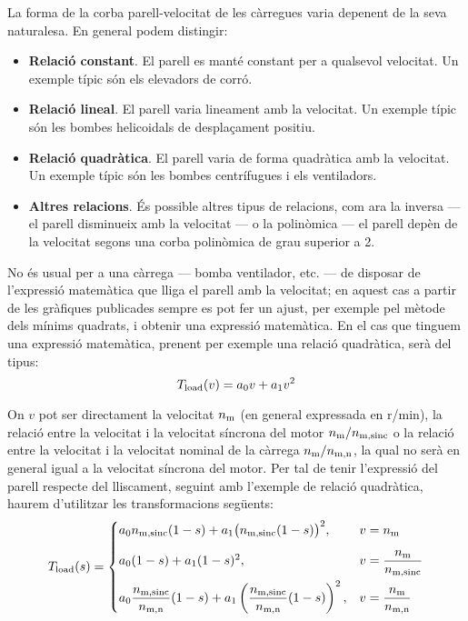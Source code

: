 La forma de la corba parell-velocitat de les càrregues varia depenent de la seva naturalesa. En general podem distingir:
\begin{itemize}
	\item  \textbf{Relació constant}. El parell es manté constant per a qualsevol velocitat. Un exemple típic són els elevadors de corró.
	
	\item  \textbf{Relació lineal}. El parell varia lineament amb la velocitat. Un exemple típic són les bombes helicoidals de desplaçament positiu.
	
	\item  \textbf{Relació quadràtica}. El parell varia de forma  quadràtica  amb la velocitat. Un exemple típic són les bombes centrífugues i els ventiladors.
	
	\item  \textbf{Altres relacions}. És possible altres tipus de relacions, com ara la inversa --- el parell disminueix amb la velocitat --- o la polinòmica --- el parell depèn de la velocitat segons una corba polinòmica de grau superior a 2.
\end{itemize}

No és  usual per a una càrrega --- bomba ventilador, etc. --- de disposar de l'expressió matemàtica que lliga el parell amb la velocitat; en aquest cas a partir de les gràfiques publicades sempre es pot fer un ajust, per exemple pel mètode dels mínims quadrats, i obtenir una expressió matemàtica. En el cas que tinguem una expressió matemàtica, prenent per exemple una relació quadràtica, serà del tipus:
\begin{equation}
	T_\mathrm{load}(v) = a_0 v + a_1 v^2
\end{equation}

On $v$ pot ser directament la velocitat $n_\mathrm{m}$ (en general expressada en r/min),  la relació entre la velocitat i la velocitat síncrona del motor $n_\mathrm{m}/n_\mathrm{m,sinc}$ o la relació entre la velocitat i la velocitat nominal de la càrrega $n_\mathrm{m}/n_\mathrm{m,n}$, la qual no serà en general igual a la velocitat síncrona del motor. Per tal de tenir l'expressió del parell respecte del lliscament,  seguint amb l'exemple de relació quadràtica, haurem d'utilitzar les transformacions següents:
\begin{equation}\label{eq:Tload-v-s}
	T_\mathrm{load}(s) = \begin{cases}
		 a_0 n_\mathrm{m,sinc}(1-s) + a_1 \big(n_\mathrm{m,sinc}(1-s)\big)^2,  & v=n_\mathrm{m}  \\[2ex]
		a_0 (1-s) + a_1 (1-s)^2, &   
		v =\dfrac{n_\mathrm{m}}{n_\mathrm{m,sinc}} \\[2ex]
		 a_0 \dfrac{n_\mathrm{m,sinc}}{n_\mathrm{m,n}}(1-s) + a_1 \left(\dfrac{n_\mathrm{m,sinc}}{n_\mathrm{m,n}}(1-s)\right)^2, &    v = \dfrac{n_\mathrm{m}}{n_\mathrm{m,n}}
	\end{cases}
\end{equation}


